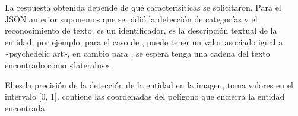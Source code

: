 \begin{sphinxVerbatim}[commandchars=\\\{\}]
   \PYG{p}{[}
         \PYG{p}{[}
             
             
             
        \PYG{p}{]}
         \PYG{p}{[}
               
               
               
               
                 \PYG{p}{[}
                     
                     
                \PYG{p}{]}
        \PYG{p}{]}
  \PYG{p}{]}
\end{sphinxVerbatim}

La respuesta obtenida depende de qué caracterísiticas se solicitaron. Para el JSON anterior suponemos que se pidió la detección de
categorías y el reconocimiento de texto.  es un identificador,
 es la descripción textual de la entidad; por ejemplo,
para el caso de ,  puede tener un valor
asociado igual a «psychedelic art», en cambio para ,
se espera tenga una cadena del texto encontrado como «lateralus».

El  es la precisión de la detección de la entidad en la imagen,
toma valores en el intervalo {[}0, 1{]}.  contiene
las coordenadas del polígono que encierra la entidad encontrada.


